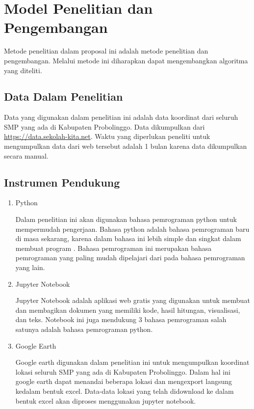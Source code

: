 \section{Model Penelitian dan Pengembangan}

Metode penelitian dalam proposal ini adalah metode penelitian dan pengembangan. Melalui metode ini diharapkan dapat mengembangkan algoritma yang diteliti.

\subsection{Data Dalam Penelitian}
    
Data yang digunakan dalam penelitian ini adalah data koordinat dari seluruh SMP yang ada di Kabupaten Probolinggo. Data dikumpulkan dari \url{https://data.sekolah-kita.net}. Waktu yang diperlukan peneliti untuk mengumpulkan data dari web tersebut adalah 1 bulan karena data dikumpulkan secara manual.

\subsection{Instrumen Pendukung}
\begin{enumerate}
    \item Python
    
    Dalam penelitian ini akan digunakan bahasa pemrograman python untuk mempermudah pengerjaan. Bahasa python adalah bahasa pemrograman baru di masa sekarang, karena dalam bahasa ini lebih simple dan singkat dalam membuat program \cite{syahrudin2018input}. Bahasa pemrograman ini merupakan bahasa pemrograman yang paling mudah dipelajari dari pada bahasa pemrograman yang lain.
    
    \item Jupyter Notebook
    
    Jupyter Notebook adalah aplikasi web gratis yang digunakan untuk membuat dan membagikan dokumen yang memiliki kode, hasil hitungan, visualisasi, dan teks. Notebook ini juga mendukung 3 bahasa pemrograman salah satunya adalah bahasa pemrograman python.

	\item Google Earth
	
	Google earth digunakan dalam penelitian ini untuk mengumpulkan koordinat lokasi seluruh SMP yang ada di Kabupaten Probolinggo. Dalam hal ini google earth dapat menandai beberapa lokasi dan mengexport langsung kedalam bentuk excel. Data-data lokasi yang telah didownload ke dalam bentuk excel akan diproses menggunakan jupyter notebook.

\end{enumerate}

